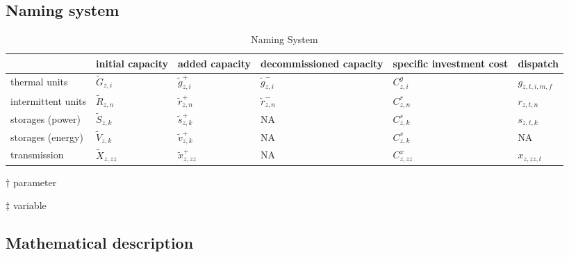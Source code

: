 \documentclass[review, 3p, times, 12pt]{elsarticle} %
\begin{document}
\subsection{Naming system}
\begin{table*}
\centering
\begin{threeparttable}
\caption{Naming System}
\begin{tabulary}{\textwidth}{LLLLLL}
\toprule
& initial capacity\tnote{$\dagger$}    & added capacity\tnote{$\ddagger$}  & decommissioned capacity\tnote{$\ddagger$} & specific investment cost\tnote{$\dagger$} & dispatch\tnote{$\ddagger$}   \\
\midrule
thermal units &$\widetilde{G}_{z,i}$                &$\widetilde{g}^{+}_{z,i}$         &$\widetilde{g}^{-}_{z,i}$                &$C^{g}_{z,i}$                            &$g_{z,t,i,m,f}$              \\
intermittent units &$\widetilde{R}_{z,n}$                &$\widetilde{r}^{+}_{z,n}$        &$\widetilde{r}^{-}_{z,n}$                &$C^{r}_{z,n}$                            &$r_{z,t,n}$                  \\
storages (power)    &$\widetilde{S}_{z,k}$                &$\widetilde{s}^{+}_{z,k}$        & NA &$C^{s}_{z,k}$                             &$s_{z,t,k}$                  \\%
storages (energy)   &$\widetilde{V}_{z,k}$                &$\widetilde{v}^{+}_{z,k}$        & NA &$C^{v}_{z,k}$                            & NA                            \\%
transmission &$\widetilde{X}_{z,zz}$               &$\widetilde{x}^{+}_{z,zz}$       & NA &$C^{x}_{z,zz}$                           &$x_{z,zz,t}$                 \\%
\bottomrule
\end{tabulary}

\begin{tablenotes}
\item[$\dagger$] parameter
\item[$\ddagger$] variable
\end{tablenotes}
\end{threeparttable}
\end{table*}

\newpage

\subsection{Mathematical description}\label{mathmodel}
\end{document}
